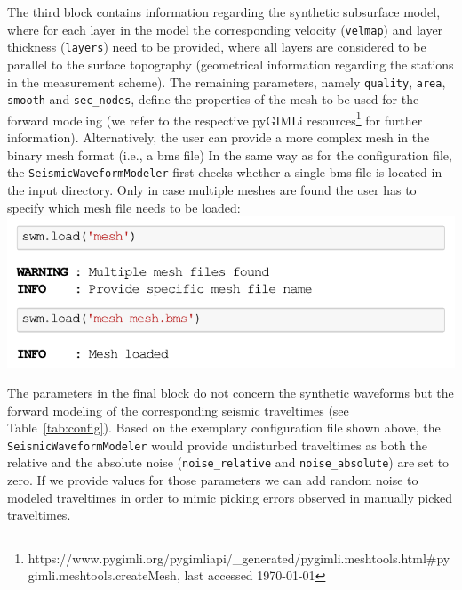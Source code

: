\documentclass[a4paper,fleqn]{cas-sc}
\begin{document}
The third block contains information regarding the synthetic subsurface model, where for each layer in the model the corresponding velocity (\texttt{velmap}) and layer thickness (\texttt{layers}) need to be provided, where all layers are considered to be parallel to the surface topography (geometrical information regarding the stations in the measurement scheme). The remaining parameters, namely \texttt{quality}, \texttt{area}, \texttt{smooth} and \texttt{sec\_nodes}, define the properties of the mesh to be used for the forward modeling (we refer to the respective pyGIMLi resources\footnote{https://www.pygimli.org/pygimliapi/\_generated/pygimli.meshtools.html\#pygimli.meshtools.createMesh, last accessed \today} for further information).
Alternatively, the user can provide a more complex mesh in the binary mesh format (i.e., a bms file)
In the same way as for the configuration file, the \texttt{SeismicWaveformModeler} first checks whether a single bms file is located in the input directory. Only in case multiple meshes are found the user has to specify which mesh file needs to be loaded:
\newline
\includegraphics[width=.5\textwidth]{./figures/load_mesh.pdf}

The parameters in the final block do not concern the synthetic waveforms but the forward modeling of the corresponding seismic traveltimes (see Table~\ref{tab:config}). Based on the exemplary configuration file shown above, the \texttt{SeismicWaveformModeler} would provide undisturbed traveltimes as both the relative and the absolute noise (\texttt{noise\_relative} and \texttt{noise\_absolute}) are set to zero. If we provide values for those parameters we can add random noise to modeled traveltimes in order to mimic picking errors observed in manually picked traveltimes.
\end{document}
